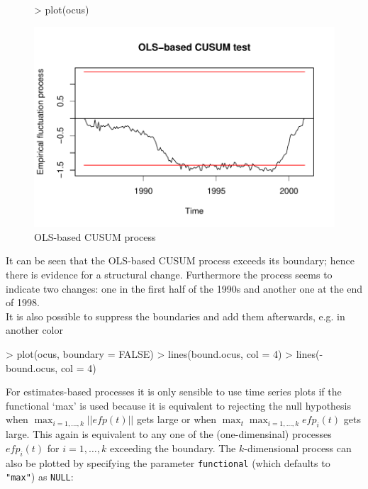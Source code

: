 \documentclass[10pt,a4paper]{article}
\begin{document}
\begin{figure}[hbtp]
\begin{center}
\begin{Schunk}
\begin{Sinput}
> plot(ocus)
\end{Sinput}
\end{Schunk}
\includegraphics{strucchange-intro-OLS-CUSUM}
\caption{\label{fig:ocus} OLS-based CUSUM process}
\end{center}
\end{figure}

It can be seen that the OLS-based CUSUM process exceeds its boundary; hence
there is evidence for a structural change. Furthermore the process seems to
indicate two changes: one in the first half of the 1990s and another one at the
end of 1998.\\

It is also possible to suppress the boundaries and add them afterwards, e.g. in
another color
\begin{Schunk}
\begin{Sinput}
> plot(ocus, boundary = FALSE)
> lines(bound.ocus, col = 4)
> lines(-bound.ocus, col = 4)
\end{Sinput}
\end{Schunk}
For estimates-based processes it is only sensible to use time series plots if
the functional `max' is used because it is equivalent to rejecting the null
hypothesis when $\max_{i=1, \dots, k} ||\mathit{efp}(t)||$ gets large or when
$\max_t \max_{i=1, \dots, k} \mathit{efp}_i(t)$ gets large. This again is
equivalent to any one of the (one-dimensinal) processes $\mathit{efp}_i(t)$ for
$i = 1, \dots, k$ exceeding the boundary. The $k$-dimensional process can also
be plotted by specifying the parameter {\tt functional} (which defaults to {\tt
"max"}) as {\tt NULL}:
\end{document}
